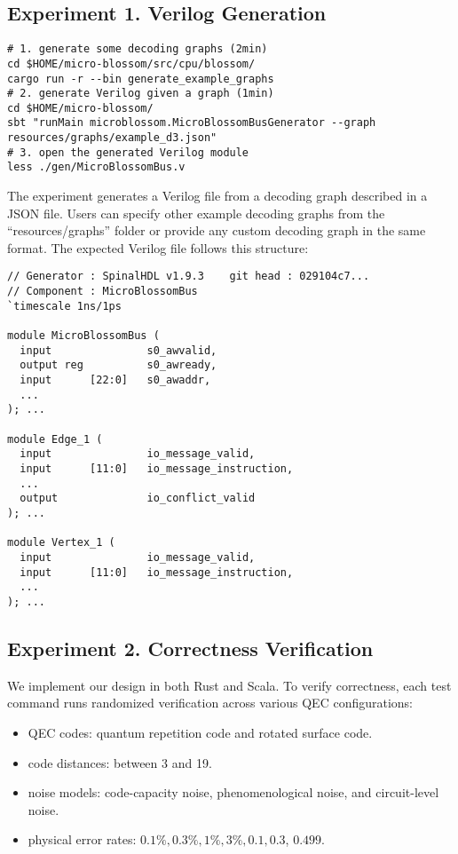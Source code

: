 \subsection{Experiment 1. Verilog Generation}


\begin{verbatim}
# 1. generate some decoding graphs (2min)
cd $HOME/micro-blossom/src/cpu/blossom/
cargo run -r --bin generate_example_graphs
# 2. generate Verilog given a graph (1min)
cd $HOME/micro-blossom/
sbt "runMain microblossom.MicroBlossomBusGenerator --graph resources/graphs/example_d3.json"
# 3. open the generated Verilog module
less ./gen/MicroBlossomBus.v
\end{verbatim}


The experiment generates a Verilog file from a decoding graph described in a JSON file.
Users can specify other example decoding graphs from the ``resources/graphs'' folder or provide any custom decoding graph in the same format.
The expected Verilog file follows this structure:

\begin{verbatim}
// Generator : SpinalHDL v1.9.3    git head : 029104c7...
// Component : MicroBlossomBus
`timescale 1ns/1ps

module MicroBlossomBus (
  input               s0_awvalid,
  output reg          s0_awready,
  input      [22:0]   s0_awaddr,
  ...
); ...

module Edge_1 (
  input               io_message_valid,
  input      [11:0]   io_message_instruction,
  ...
  output              io_conflict_valid
); ...

module Vertex_1 (
  input               io_message_valid,
  input      [11:0]   io_message_instruction,
  ...
); ...
\end{verbatim}

\subsection{Experiment 2. Correctness Verification}\label{ssec:ae-correctness}

We implement our design in both Rust and Scala.
To verify correctness, each test command runs randomized verification across various QEC configurations:
\begin{itemize}
    \item QEC codes: quantum repetition code and rotated surface code.
    \item code distances: between 3 and 19.
    \item noise models: code-capacity noise, phenomenological noise, and circuit-level noise.
    \item physical error rates: $0.1\%, 0.3\%, 1\%, 3\%, 0.1, 0.3$, $0.499$.
\end{itemize}

